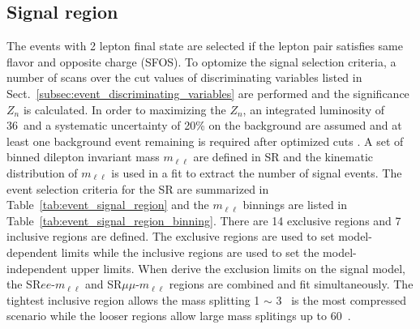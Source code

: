 
\subsection{Signal region}
\label{subsec:event_signal_region}
The events with 2 lepton final state are selected if the lepton pair satisfies same flavor and opposite charge (SFOS).
To optomize the signal selection criteria, a number of scans over the cut values of discriminating variables listed in Sect.~\ref{subsec:event_discriminating_variables} are performed and the significance $Z_{n}$ is calculated.
In order to maximizing the $Z_{n}$, an integrated luminosity of 36~\ifb and a systematic uncertainty of 20\% on the background are assumed and at least one background event remaining is required after optimized cuts . 
A set of binned dilepton invariant mass $m_{\ell \ell}$ are defined in SR and the kinematic distribution of $m_{\ell \ell}$ is used in a fit to extract the number of signal events.
The event selection criteria for the SR are summarized in Table~\ref{tab:event_signal_region} and the $m_{\ell\ell}$ binnings are listed in Table~\ref{tab:event_signal_region_binning}.
There are 14 exclusive regions and 7 inclusive regions are defined.
The exclusive regions are used to set model-dependent limits while the inclusive regions are used to set the model-independent upper limits.
When derive the exclusion limits on the signal model, the SR$ee$-$m_{\ell\ell}$ and SR$\mu\mu$-$m_{\ell\ell}$ regions are combined and fit simultaneously.
The tightest inclusive region allows the mass splitting 1 $\sim$ 3~{\GeV} is the most compressed scenario while the looser regions allow large mass splitings up to 60~{\GeV}.

